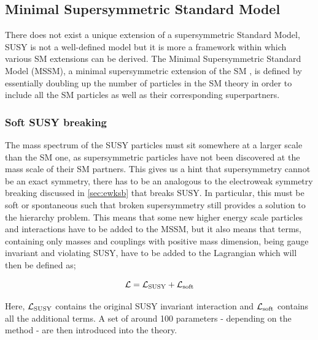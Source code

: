 		\subsection{Minimal Supersymmetric Standard Model}
		\label{sec:MSSM}
			
			There does not exist a unique extension of a supersymmetric Standard Model, \ie SUSY is not a well-defined model but it is more a framework within which various SM extensions can be derived.
			The Minimal Supersymmetric Standard Model (MSSM), a minimal supersymmetric extension of the SM \cite{Jegerlehner:2013nna}, is defined by essentially doubling up the number of particles in the SM theory in order to include all the SM particles as well as their corresponding superpartners.

			\subsubsection*{Soft SUSY breaking}
				
				The mass spectrum of the SUSY particles must sit somewhere at a larger scale than the SM one, as supersymmetric particles have not been discovered at the mass scale of their SM partners. This gives us a hint that supersymmetry cannot be an exact symmetry, there has to be an analogous to the electroweak symmetry breaking discussed in \ref{sec:ewksb} that breaks SUSY. In particular, this must be soft or spontaneous such that broken supersymmetry still provides a solution to the hierarchy problem. This means that some new higher energy scale particles and interactions have to be added to the MSSM, but it also means that terms, containing only masses and couplings with positive mass dimension, being gauge invariant and violating SUSY, have to be added to the Lagrangian which will then be defined as;

				\begin{equation}
				\label{eq:soft_sb}
					\cal L = \cal {L_{\mathrm{SUSY}}} + \cal {L_{\mathrm{soft}}}
				\end{equation}

				\noindent Here, $\cal {L_{\mathrm{SUSY}}}$ contains the original SUSY invariant interaction and $\cal {L_{\mathrm{soft}}}$ contains all the additional terms. A set of around 100 parameters - depending on the method - are then introduced into the theory.

					
